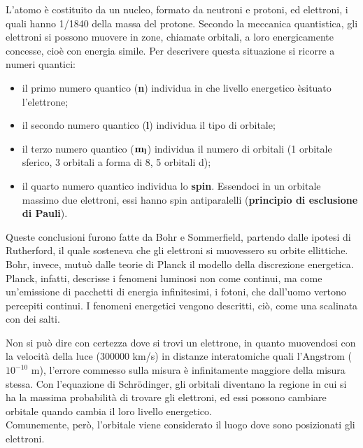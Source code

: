 L’atomo è costituito da un nucleo, formato da neutroni e protoni, ed elettroni, i quali hanno 1/1840 della massa del protone. Secondo la meccanica quantistica, gli elettroni si possono muovere in zone, chiamate orbitali, a loro energicamente concesse, cioè con energia simile.
Per descrivere questa situazione si ricorre a numeri quantici:
\begin{itemize}
    \item il primo numero quantico (\textbf{n}) individua in che livello energetico èsituato l'elettrone;
    \item il secondo numero quantico (\textbf{l}) individua il tipo di orbitale;
    \item il terzo numero quantico ($\mathrm{\bold{m_l}}$) individua il numero di orbitali (1 orbitale sferico, 3 orbitali a forma di 8, 5 orbitali d);
    \item il quarto numero quantico individua lo \textbf{spin}. Essendoci in un orbitale massimo due elettroni, essi hanno spin antiparalelli (\textbf{principio di esclusione di Pauli}).
\end{itemize}

Queste conclusioni furono fatte da Bohr e Sommerfield, partendo dalle ipotesi di Rutherford, il quale sosteneva che gli elettroni si muovessero su orbite ellittiche. Bohr, invece, mutuò dalle teorie di Planck il modello della discrezione energetica. Planck, infatti, descrisse i fenomeni luminosi non come continui, ma come un’emissione di pacchetti di energia infinitesimi, i fotoni, che dall’uomo vertono percepiti continui. I fenomeni energetici vengono descritti, ciò, come una scalinata con dei salti.

Non si può dire con certezza dove si trovi un elettrone, in quanto muovendosi con la velocità della luce (300000 km/s) in distanze interatomiche quali l’Angstrom ($10^{-10}$ m), l’errore commesso sulla misura è infinitamente maggiore della misura stessa. Con l’equazione di Schrödinger, gli orbitali diventano la regione in cui si ha la massima probabilità di trovare gli elettroni, ed essi possono cambiare orbitale quando cambia il loro livello energetico.\\
Comunemente, però, l’orbitale viene considerato il luogo dove sono posizionati gli elettroni.

